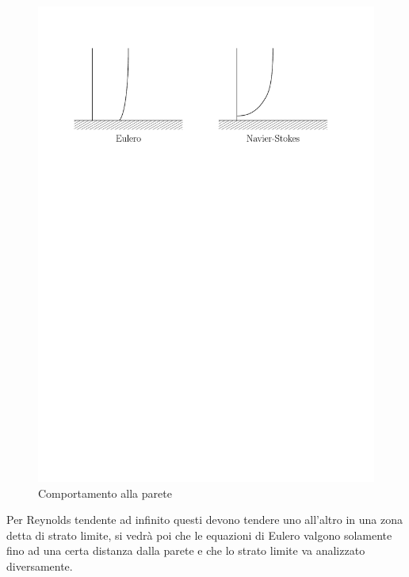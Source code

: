 	\begin{figure}[ht]
		\includegraphics[scale=0.7]{./7.1 Correnti ad alto numero di Reynolds/7.1-1}
		\centering
		\caption{Comportamento alla parete}
	\end{figure}
%
Per Reynolds tendente ad infinito questi devono tendere uno all'altro in una zona detta di strato limite, si vedrà poi che le equazioni di Eulero valgono solamente fino ad una certa distanza dalla parete e che lo strato limite va analizzato diversamente.

